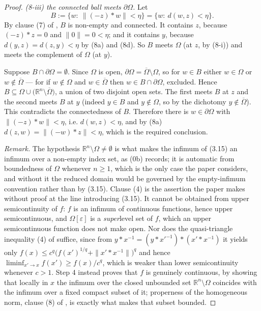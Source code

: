 \begin{proof}
\emph{(8-iii) the connected ball meets $\partial\Omega$.} Let
\[
 B:=\big\{w:\ \|(-z)*w\|<\eta\big\}=\{w:\ d(w,z)<\eta\}.
\]
By clause (7) of , $B$ is non-empty and connected. It contains $z$,
because $(-z)*z=0$ and $\|0\|=0<\eta$; and it contains $y$, because
$d(y,z)=d(z,y)<\eta$ by (8a) and (8d). So $B$ meets $\Omega$ (at $z$, by (8-i)) and meets
the complement of $\Omega$ (at $y$).

Suppose $B\cap\partial\Omega=\emptyset$. Since $\Omega$ is open,
$\partial\Omega=\overline\Omega\setminus\Omega$, so for $w\in B$ either $w\in\Omega$ or
$w\notin\overline\Omega$ --- for if $w\notin\Omega$ and $w\in\overline\Omega$ then
$w\in B\cap\partial\Omega$, excluded. Hence
$B\subseteq\Omega\cup\big(\mathbb R^{n}\setminus\overline\Omega\big)$, a union of two
disjoint open sets. The first meets $B$ at $z$ and the second meets $B$ at $y$ (indeed
$y\in B$ and $y\notin\Omega$, so by the dichotomy $y\notin\overline\Omega$). This
contradicts the connectedness of $B$. Therefore there is $w\in\partial\Omega$ with
$\|(-z)*w\|<\eta$, i.e. $d(w,z)<\eta$, and by (8a) $d(z,w)=\|(-w)*z\|<\eta$, which is the
required conclusion.

\medskip\noindent\emph{Remark.} The hypothesis
$\mathbb R^{n}\setminus\Omega\neq\emptyset$ is what makes the infimum of (3.15) an
infimum over a non-empty index set, as (0b) records; it is automatic from boundedness of
$\Omega$ whenever $n\ge1$, which is the only case the paper considers, and without it the
reduced domain would be governed by the empty-infimum convention rather than by (3.15).
Clause (4) is the assertion the paper makes without proof at the line introducing (3.15).
It cannot be obtained from upper semicontinuity of $f$: $f$ is an infimum of continuous
functions, hence upper semicontinuous, and $\Omega[\varepsilon]$ is a \emph{super}level set
of $f$, which an upper semicontinuous function does not make open. Nor does the
quasi-triangle inequality (4) of  suffice, since from
$y*x^{-1}=(y*x'^{-1})*(x'*x^{-1})$ it yields only
$f(x)\le c^{q}\big(f(x')^{1/q}+\|x'*x^{-1}\|\big)^{q}$ and hence
$\liminf_{x'\to x}f(x')\ge f(x)/c^{q}$, which is weaker than lower semicontinuity whenever
$c>1$. Step 4 instead proves that $f$ is genuinely continuous, by showing that locally in
$x$ the infimum over the closed unbounded set $\mathbb R^{n}\setminus\Omega$ coincides with
the infimum over a fixed compact subset of it; properness of the homogeneous norm, clause (8)
of , is exactly what makes that subset bounded.
\end{proof}
